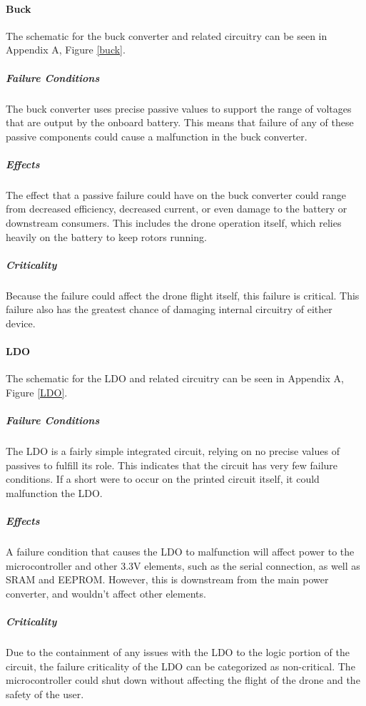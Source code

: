 \documentclass[12pt]{article}
\begin{document}
\paragraph{Buck}\par The schematic for the buck converter and related circuitry can be seen in Appendix A, Figure \ref{buck}.
\subparagraph{Failure Conditions}
The buck converter uses precise passive values to support the range of voltages that are output by the onboard battery. This means that failure of any of these passive components could cause a malfunction in the buck converter.
\subparagraph{Effects}
The effect that a passive failure could have on the buck converter could range from decreased efficiency, decreased current, or even damage to the battery or downstream consumers. This includes the drone operation itself, which relies heavily on the battery to keep rotors running.
\subparagraph{Criticality}
Because the failure could affect the drone flight itself, this failure is critical. This failure also has the greatest chance of damaging internal circuitry of either device.
\paragraph{LDO}
\par The schematic for the LDO and related circuitry can be seen in Appendix A, Figure \ref{LDO}.
\subparagraph{Failure Conditions}
The LDO is a fairly simple integrated circuit, relying on no precise values of passives to fulfill its role. This indicates that the circuit has very few failure conditions. If a short were to occur on the printed circuit itself, it could malfunction the LDO.
\subparagraph{Effects}
A failure condition that causes the LDO to malfunction will affect power to the microcontroller and other 3.3V elements, such as the serial connection, as well as SRAM and EEPROM. However, this is downstream from the main power converter, and wouldn't affect other elements.
\subparagraph{Criticality}
Due to the containment of any issues with the LDO to the logic portion of the circuit, the failure criticality of the LDO can be categorized as non-critical. The microcontroller could shut down without affecting the flight of the drone and the safety of the user.
\end{document}
